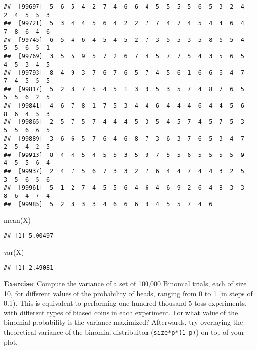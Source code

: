 \documentclass[
]{book}
\newenvironment{Shaded}{\begin{snugshade}}{\end{snugshade}}
\newcommand{\FunctionTok}[1]{\textcolor[rgb]{0.00,0.00,0.00}{#1}}
\newcommand{\NormalTok}[1]{#1}
\begin{document}
\begin{verbatim}
##  [99697]  5  6  5  4  2  7  4  6  6  4  5  5  5  5  6  5  3  2  4  2  4  5  5  3
##  [99721]  5  3  4  4  5  6  4  2  2  7  7  4  7  4  5  4  4  6  4  7  8  6  4  6
##  [99745]  6  5  4  6  4  5  4  5  2  7  3  5  5  3  5  8  6  5  4  5  5  6  5  1
##  [99769]  3  5  5  9  5  7  2  6  7  4  5  7  7  5  4  3  5  6  5  4  5  3  4  5
##  [99793]  8  4  9  3  7  6  7  6  5  7  4  5  6  1  6  6  6  4  7  7  4  5  5  5
##  [99817]  5  2  3  7  5  4  5  1  3  3  5  3  5  7  4  8  7  6  5  5  5  6  2  5
##  [99841]  4  6  7  8  1  7  5  3  4  4  6  4  4  4  6  4  4  5  6  8  6  4  5  3
##  [99865]  2  5  7  5  7  4  4  4  5  3  5  4  5  7  4  5  7  5  3  5  5  6  6  5
##  [99889]  3  6  6  5  7  6  4  6  8  7  3  6  3  7  6  5  3  4  7  2  5  4  2  5
##  [99913]  8  4  4  5  4  5  5  3  5  3  7  5  5  6  5  5  5  5  9  4  5  5  6  4
##  [99937]  2  4  7  5  6  7  3  3  2  7  6  4  4  7  4  4  3  2  5  3  5  6  5  6
##  [99961]  5  1  2  7  4  5  5  6  4  6  4  6  9  2  6  4  8  3  3  8  6  4  7  4
##  [99985]  5  2  3  3  3  4  6  6  6  3  4  5  5  7  4  6
\end{verbatim}

\begin{Shaded}
\begin{Highlighting}[]
\FunctionTok{mean}\NormalTok{(X)}
\end{Highlighting}
\end{Shaded}

\begin{verbatim}
## [1] 5.00497
\end{verbatim}

\begin{Shaded}
\begin{Highlighting}[]
\FunctionTok{var}\NormalTok{(X)}
\end{Highlighting}
\end{Shaded}

\begin{verbatim}
## [1] 2.49081
\end{verbatim}

\textbf{Exercise}: Compute the variance of a set of 100,000 Binomial trials, each of size 10, for different values of the probability of heads, ranging from 0 to 1 (in steps of 0.1). This is equivalent to performing one hundred thousand 5-toss experiments, with different types of biased coins in each experiment. For what value of the binomial probability is the variance maximized? Afterwards, try overlaying the theoretical variance of the binomial distribuiton (\texttt{size*p*(1-p)}) on top of your plot.
\end{document}
